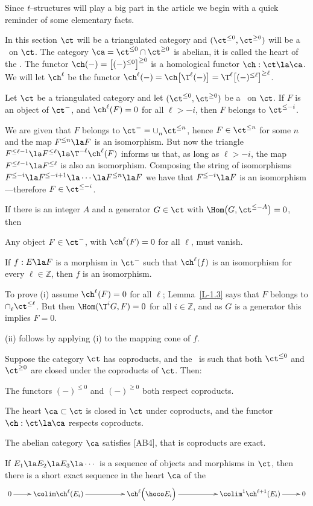 \documentclass[11pt]{amsart}
\newcommand{\zz}{{\mathbb Z}}
\begin{document}
Since {\it t}--structures will play a big part in the article
we begin with a quick reminder of some elementary facts.



In this section $\ct$ will be a triangulated category and
$(\ct^{\leq0},\ct^{\geq0})$
will be a \tstr\ on $\ct$. The category $\ca=\ct^{\leq0}\cap\ct^{\geq0}$
is abelian, it is called the heart of the \tstr. The functor
$\ch(-)=\big[(-)^{\leq0}\big]^{\geq0}$ is a homological functor $\ch:\ct\la\ca$.
We will let $\ch^\ell$ be the functor
$\ch^\ell(-)=\ch\big[\T^\ell(-)\big]=\T^\ell\big[(-)^{\leq\ell}\big]^{\geq\ell}$.
\ermd

Let $\ct$ be a triangulated category and let $(\ct^{\leq0},\ct^{\geq0})$
be a \tstr\ on $\ct$. If $F$ is an object of $\ct^-$, and
$\ch^\ell(F)=0$ for all $\ell>-i$, then $F$ belongs to 
$\ct^{\leq -i}$.
\elem


\prf
We are given that $F$ belongs to $\ct^-=\cup_n^{}\ct^{\leq n}$, hence
$F\in\ct^{\leq n}$ for some $n$ and the map
$F^{\leq n}\la F$ is an isomorphism. But
now the triangle $F^{\leq\ell-1}\la F^{\leq\ell}\la \T^{-\ell}\ch^\ell(F)$
informs us that, as long as $\ell>-i$, the map
$F^{\leq\ell-1}\la  F^{\leq\ell}$
is also an isomorphism.
Composing the string of isomorphisms
$F^{\leq-i}\la F^{\leq-i+1}\la\cdots\la F^{\leq n}\la F$
we have
that $F^{\leq-i}\la F$
is an isomorphism---therefore $F\in\ct^{\leq-i}$.
\eprf

If there is an integer $A$ and a generator $G\in\ct$ with
$\Hom\big(G,\ct^{\leq-A}\big)=0$, then
\be
\item
  Any object $F\in\ct^-$,
with $\ch^\ell(F)=0$ for all $\ell$, must vanish.
\item
If $f:E\la F$ is a morphism in $\ct^-$ such that $\ch^\ell(f)$ is an
isomorphism for every $\ell\in\zz$, then $f$ is an isomorphism.
\ee
\elem

\prf
To prove (i) assume $\ch^\ell(F)=0$ for
all $\ell$;
Lemma~\ref{L-1.3} says that $F$ belongs to $\cap_\ell^{}\ct^{\leq\ell}$.
But then $\Hom(\T^iG,F)=0$ for all $i\in\zz$, and as $G$ is a generator
this implies $F=0$.

(ii) follows by applying (i) to the mapping cone of $f$.
\eprf

Suppose the category $\ct$ has coproducts, and the \tstr\ is such that
both $\ct^{\leq0}$ and $\ct^{\geq0}$ are closed under the coproducts of $\ct$.
Then:
\be
\item
  The functors $(-)^{\leq0}$ and $(-)^{\geq0}$ both respect coproducts.
\item
  The heart $\ca\subset\ct$ is closed in $\ct$ under coproducts,
  and the
  functor $\ch:\ct\la\ca$ respects coproducts.
\item
  The abelian category
  $\ca$ satisfies [AB4], that is coproducts are exact.
\item
  If $E_1\la E_2\la E_3\la\cdots$ is a sequence of objects and morphisms
  in $\ct$, then 
there is a short exact
sequence in the heart $\ca$ of the \tstr
\[\xymatrix{
  0 \ar[r] & 
  \colim\ch^\ell(E_i) \ar[rr]& &\ch^\ell\Big(\hoco E_i\Big)\ar[rr] &&
  \colim^1\ch^{\ell+1}(E_i)\ar[r] & 0
}\]
\ee
\elem
\end{document}

